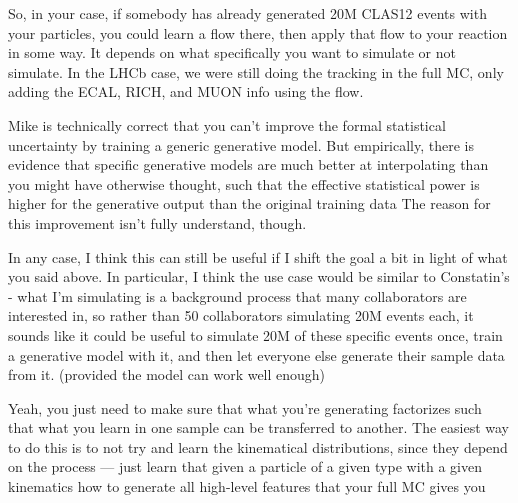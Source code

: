     So, in your case, if somebody has already generated 20M CLAS12 events with your particles, you could learn a flow there, then apply that flow to your reaction in some way. It depends on what specifically you want to simulate or not simulate. In the LHCb case, we were still doing the tracking in the full MC, only adding the ECAL, RICH, and MUON info using the flow. 


    Mike is technically correct that you can't improve the formal statistical uncertainty by training a generic generative model.  But empirically, there is evidence that specific generative models are much better at interpolating than you might have otherwise thought, such that the effective statistical power is higher for the generative output than the original training data  The reason for this improvement isn't fully understand, though.


    In any case, I think this can still be useful if I shift the goal a bit in light of what you said above. In particular, I think the use case would be similar to Constatin's - what I'm simulating is a background process that many collaborators are interested in,  so rather than 50 collaborators simulating 20M events each, it sounds like it could be useful to simulate 20M of these specific events once, train a generative model with it, and then let everyone else generate their sample data from it. (provided the model can work well enough)
    
    Yeah, you just need to make sure that what you’re generating factorizes such that what you learn in one sample can be transferred to another. The easiest way to do this is to not try and learn the kinematical distributions, since they depend on the process — just learn that given a particle of a given type with a given kinematics how to generate all high-level features that your full MC gives you


    \fi
    


